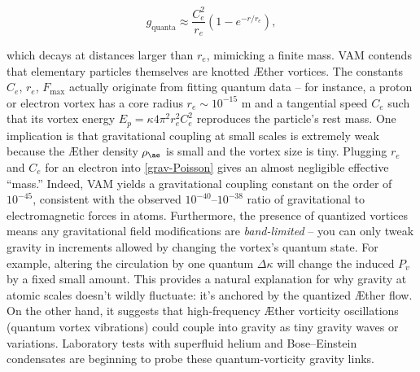 \begin{equation}
    g_{\text{quanta}} \approx \frac{C_e^2}{r_e} \left(1 - e^{-r/r_e} \right),
    \label{eq:g_quanta}
\end{equation}

which decays at distances larger than $r_e$, mimicking a finite mass.
VAM contends that elementary particles themselves are knotted Æther vortices. The constants $C_e$, $r_e$, $F_{\max}$ actually originate from fitting quantum data – for instance, a proton or electron vortex has a core radius $r_e \sim 10^{-15}$ m and a tangential speed $C_e$ such that its vortex energy $E_p = \kappa 4\pi^2 r_e^2 C_e^2$ reproduces the particle’s rest mass. One implication is that gravitational coupling at small scales is extremely weak because the Æther density $\rho_{\ae}$ is small and the vortex size is tiny. Plugging $r_e$ and $C_e$ for an electron into \eqref{grav-Poisson} gives an almost negligible effective “mass.” Indeed, VAM yields a gravitational coupling constant on the order of $10^{-45}$, consistent with the observed $10^{-40}$–$10^{-38}$ ratio of gravitational to electromagnetic forces in atoms. Furthermore, the presence of quantized vortices means any gravitational field modifications are \textit{band-limited} – you can only tweak gravity in increments allowed by changing the vortex’s quantum state. For example, altering the circulation by one quantum $\Delta \kappa$ will change the induced $P_v$ by a fixed small amount. This provides a natural explanation for why gravity at atomic scales doesn’t wildly fluctuate: it’s anchored by the quantized Æther flow. On the other hand, it suggests that high-frequency Æther vorticity oscillations (quantum vortex vibrations) could couple into gravity as tiny gravity waves or variations. Laboratory tests with superfluid helium and Bose–Einstein condensates are beginning to probe these quantum-vorticity gravity links.

